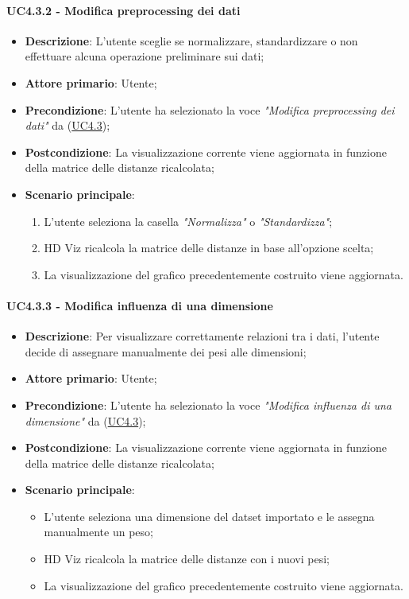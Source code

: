 \paragraph{UC4.3.2 - Modifica preprocessing dei dati}
\label{par:uc4.3.2}
\begin{itemize}
    \item \textbf{Descrizione}: L’utente sceglie se normalizzare, standardizzare o non effettuare alcuna operazione preliminare sui dati;

    \item \textbf{Attore primario}: Utente;
    \item \textbf{Precondizione}: L'utente ha selezionato la voce \emph{"Modifica preprocessing dei dati"} da (\hyperref[ssub:uc4.3]{UC4.3});
    \item \textbf{Postcondizione}: La visualizzazione corrente viene aggiornata in funzione della matrice delle distanze ricalcolata;
    \item \textbf{Scenario principale}:
    \begin{enumerate}
        \item L'utente seleziona la casella \emph{"Normalizza"} o \emph{"Standardizza"};
        \item HD Viz ricalcola la matrice delle distanze in base all'opzione scelta;
        \item La visualizzazione del grafico precedentemente costruito viene aggiornata.
    \end{enumerate}
\end{itemize}

\paragraph{UC4.3.3 - Modifica influenza di una dimensione}
\label{par:uc4.3.3}
\begin{itemize}
    \item \textbf{Descrizione}: Per visualizzare correttamente relazioni tra i dati,
                                l’utente decide di assegnare manualmente dei pesi alle dimensioni;

    \item \textbf{Attore primario}: Utente;
    \item \textbf{Precondizione}: L'utente ha selezionato la voce \emph{"Modifica influenza di una dimensione"} da (\hyperref[ssub:uc4.3]{UC4.3});

    \item \textbf{Postcondizione}: La visualizzazione corrente viene aggiornata in funzione della matrice delle distanze ricalcolata;
    \item \textbf{Scenario principale}:
    \begin{itemize}
        \item L’utente seleziona una dimensione del datset importato e le assegna manualmente un peso;
        \item HD Viz ricalcola la matrice delle distanze con i nuovi pesi;
        \item La visualizzazione del grafico precedentemente costruito viene aggiornata.
    \end{itemize}
\end{itemize}

